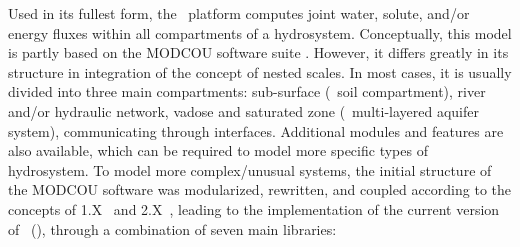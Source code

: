 Used in its fullest form, the \cawaqs\ platform computes joint water, solute, and/or energy fluxes within all compartments of a hydrosystem. Conceptually, this model is partly based on the MODCOU software suite \citep{marsily78,ledoux1980}. However, it differs greatly in its structure in integration of the concept of nested scales. In most cases, it is usually divided into three main compartments: sub-surface (\ie~soil compartment), river and/or hydraulic network, vadose and saturated zone (\ie~multi-layered aquifer system), communicating through interfaces. Additional modules and features are also available, which can be required to model more specific types of hydrosystem. To model more complex/unusual systems, the initial structure of the MODCOU software was modularized, rewritten, and coupled according to the concepts of \cawaqs1.X\ \citep{flipo2005} and \cawaqs2.X\ \citep{labarthe2016}, leading to the implementation of the current version of \cawaqs\genversion\ (\version), through a combination of seven main libraries:
